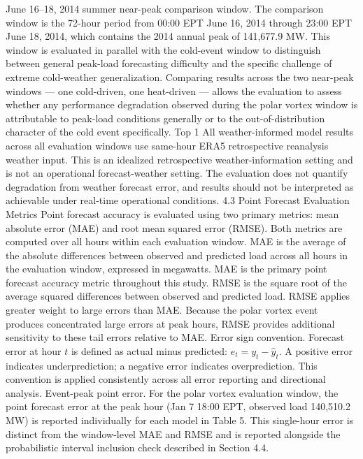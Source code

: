 June 16–18, 2014 summer near-peak comparison window. The comparison window is the 72-hour period from 00:00 EPT June 16, 2014 through 23:00 EPT June 18, 2014, which contains the 2014 annual peak of 141,677.9 MW. This window is evaluated in parallel with the cold-event window to distinguish between general peak-load forecasting difficulty and the specific challenge of extreme cold-weather generalization. Comparing results across the two near-peak windows — one cold-driven, one heat-driven — allows the evaluation to assess whether any performance degradation observed during the polar vortex window is attributable to peak-load conditions generally or to the out-of-distribution character of the cold event specifically.
Top 1%
All weather-informed model results across all evaluation windows use same-hour ERA5 retrospective reanalysis weather input. This is an idealized retrospective weather-information setting and is not an operational forecast-weather setting. The evaluation does not quantify degradation from weather forecast error, and results should not be interpreted as achievable under real-time operational conditions.
4.3 Point Forecast Evaluation Metrics
Point forecast accuracy is evaluated using two primary metrics: mean absolute error (MAE) and root mean squared error (RMSE). Both metrics are computed over all hours within each evaluation window.
MAE is the average of the absolute differences between observed and predicted load across all hours in the evaluation window, expressed in megawatts. MAE is the primary point forecast accuracy metric throughout this study.
RMSE is the square root of the average squared differences between observed and predicted load. RMSE applies greater weight to large errors than MAE. Because the polar vortex event produces concentrated large errors at peak hours, RMSE provides additional sensitivity to these tail errors relative to MAE.
Error sign convention. Forecast error at hour $t$ is defined as actual minus predicted: $e_t = y_t - \hat{y}_t$. A positive error indicates underprediction; a negative error indicates overprediction. This convention is applied consistently across all error reporting and directional analysis.
Event-peak point error. For the polar vortex evaluation window, the point forecast error at the peak hour (Jan 7 18:00 EPT, observed load 140,510.2 MW) is reported individually for each model in Table 5. This single-hour error is distinct from the window-level MAE and RMSE and is reported alongside the probabilistic interval inclusion check described in Section 4.4.
